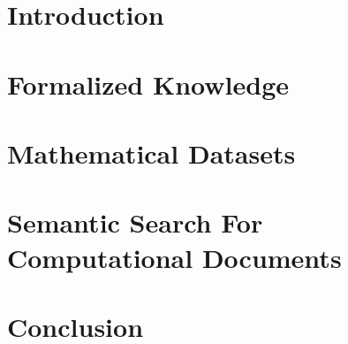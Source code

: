 \documentclass{deliverablereport}
\author{K. Ber\v{c}i\v{c}, M. Kohlhase, F. Rabe, T. Wiesing\\Computer Science, FAU Erlangen-N\"urnberg}
\begin{document}
\maketitle
\githubissuedescription

\newpage
\tableofcontents
\newpage
\section{Introduction}


\newpage
\section{Formalized Knowledge}\label{sec:knowledge}


\newpage
\section{Mathematical Datasets}\label{sec:data}


\newpage
\section{Semantic Search For Computational Documents}\label{sec:software}


\newpage
\section{Conclusion}


\newpage
\printbibliography
\end{document}
